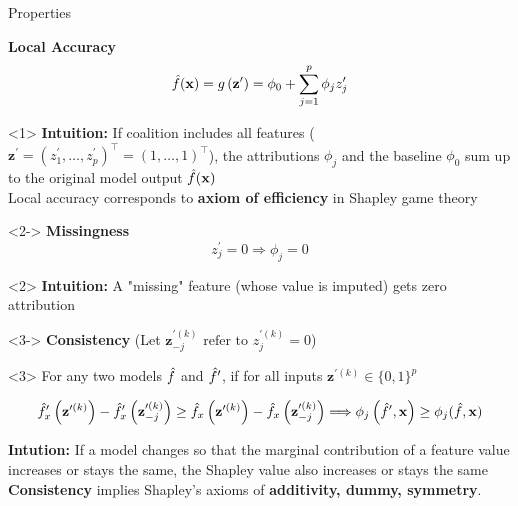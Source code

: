 \documentclass[10pt,compress,t,notes=noshow, xcolor=table]{beamer}
\begin{document}
\begin{frame}{Properties}

\textbf{Local Accuracy}
$$
\hat{f}(\mathbf{x})=g\left(\mathbf{z}^{\prime}\right)=\phi_{0}+\sum_{j=1}^{p} \phi_{j} z_{j}^{\prime}
$$

\begin{onlyenv}<1>
\textbf{Intuition:} If coalition includes all features ($\mathbf{z}^{\prime} = (z^{\prime}_1, \dots, z^{\prime}_p)^\top = (1, \dots, 1)^\top $), the attributions $\phi_j$ and the baseline $\phi_0$ sum up to the original model output $\hat{f}(\mathbf{x})$\\\medskip
Local accuracy corresponds to \textbf{axiom of efficiency} in Shapley game theory

\end{onlyenv}

\begin{onlyenv}<2->
\textbf{Missingness}
$$
z_{j}^{\prime}=0 \Longrightarrow \phi_{j}=0
$$
\end{onlyenv}

\begin{onlyenv}<2>
\textbf{Intuition:}  A "missing" feature (whose value is imputed) gets zero attribution 
\end{onlyenv}

\begin{onlyenv}<3->
\textbf{Consistency} (Let $\mathbf{z}^{\prime (k)}_{-j} \text{ refer to } z_{j}^{\prime (k)}=0$) \\
\end{onlyenv}

\begin{onlyenv}<3>
For any two models $\hat{f}$ and $\hat{f}^{\prime}$, if for all inputs $\mathbf{z}^{\prime (k)} \in \{0, 1\}^p$

$$
\hat{f}_{x}^{\prime}\left(\mathbf{z}^{\prime (k)}\right)-\hat{f}_{x}^{\prime}\left(\mathbf{z}^{\prime (k)}_{-j}\right) \geq \hat{f}_{x}\left(\mathbf{z}^{\prime (k)}\right)-\hat{f}_{x}\left(\mathbf{z}^{\prime (k)} _{-j}\right) \Longrightarrow \phi_{j}\left(\hat{f}^{\prime}, \mathbf{x}\right) \geq \phi_{j}(\hat{f}, \mathbf{x})
$$

\textbf{Intution:} If a model changes so that the marginal contribution of a feature value increases or stays the same, the Shapley value also increases or stays the same\\\medskip
\textbf{Consistency} implies Shapley’s axioms of \textbf{additivity, dummy, symmetry}.
\end{onlyenv}


\end{frame}

\endlecture
\end{document}
